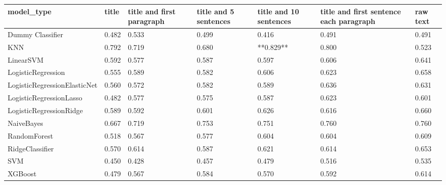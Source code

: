 \begin{tabular}{lllllll}
\toprule
                  model\_type & title & title and first paragraph & title and 5 sentences & title and 10 sentences & title and first sentence each paragraph & raw text \\
\midrule
            Dummy Classifier & 0.482 &                     0.533 &                 0.499 &                  0.416 &                                   0.491 &    0.491 \\
                         KNN & 0.792 &                     0.719 &                 0.680 &              **0.829** &                                   0.800 &    0.523 \\
                   LinearSVM & 0.592 &                     0.577 &                 0.587 &                  0.597 &                                   0.606 &    0.641 \\
          LogisticRegression & 0.555 &                     0.589 &                 0.582 &                  0.606 &                                   0.623 &    0.658 \\
LogisticRegressionElasticNet & 0.560 &                     0.572 &                 0.582 &                  0.589 &                                   0.636 &    0.631 \\
     LogisticRegressionLasso & 0.482 &                     0.577 &                 0.575 &                  0.587 &                                   0.623 &    0.601 \\
     LogisticRegressionRidge & 0.589 &                     0.592 &                 0.601 &                  0.626 &                                   0.616 &    0.660 \\
                  NaiveBayes & 0.667 &                     0.719 &                 0.753 &                  0.751 &                                   0.760 &    0.760 \\
                RandomForest & 0.518 &                     0.567 &                 0.577 &                  0.604 &                                   0.604 &    0.609 \\
             RidgeClassifier & 0.570 &                     0.614 &                 0.587 &                  0.621 &                                   0.614 &    0.653 \\
                         SVM & 0.450 &                     0.428 &                 0.457 &                  0.479 &                                   0.516 &    0.535 \\
                     XGBoost & 0.479 &                     0.567 &                 0.584 &                  0.570 &                                   0.592 &    0.614 \\
\bottomrule
\end{tabular}
